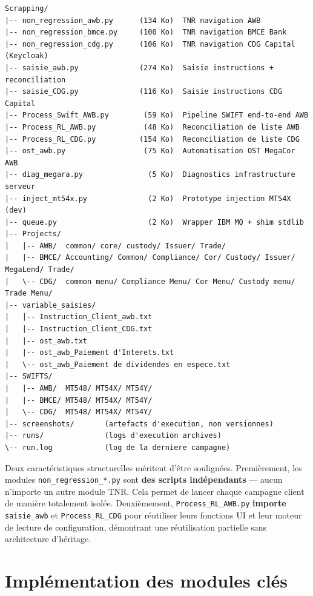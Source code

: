 \documentclass[12pt, a4paper]{report}
\begin{document}
\begin{mdframed}[backgroundcolor=codeGray, linewidth=0pt, innerleftmargin=8pt, innertopmargin=6pt]
\begin{verbatim}
Scrapping/
|-- non_regression_awb.py      (134 Ko)  TNR navigation AWB
|-- non_regression_bmce.py     (100 Ko)  TNR navigation BMCE Bank
|-- non_regression_cdg.py      (106 Ko)  TNR navigation CDG Capital (Keycloak)
|-- saisie_awb.py              (274 Ko)  Saisie instructions + reconciliation
|-- saisie_CDG.py              (116 Ko)  Saisie instructions CDG Capital
|-- Process_Swift_AWB.py        (59 Ko)  Pipeline SWIFT end-to-end AWB
|-- Process_RL_AWB.py           (48 Ko)  Reconciliation de liste AWB
|-- Process_RL_CDG.py          (154 Ko)  Reconciliation de liste CDG
|-- ost_awb.py                  (75 Ko)  Automatisation OST MegaCor AWB
|-- diag_megara.py               (5 Ko)  Diagnostics infrastructure serveur
|-- inject_mt54x.py              (2 Ko)  Prototype injection MT54X (dev)
|-- queue.py                     (2 Ko)  Wrapper IBM MQ + shim stdlib
|-- Projects/
|   |-- AWB/  common/ core/ custody/ Issuer/ Trade/
|   |-- BMCE/ Accounting/ Common/ Compliance/ Cor/ Custody/ Issuer/ MegaLend/ Trade/
|   \-- CDG/  common menu/ Compliance Menu/ Cor Menu/ Custody menu/ Trade Menu/
|-- variable_saisies/
|   |-- Instruction_Client_awb.txt
|   |-- Instruction_Client_CDG.txt
|   |-- ost_awb.txt
|   |-- ost_awb_Paiement d'Interets.txt
|   \-- ost_awb_Paiement de dividendes en espece.txt
|-- SWIFTS/
|   |-- AWB/  MT548/ MT54X/ MT54Y/
|   |-- BMCE/ MT548/ MT54X/ MT54Y/
|   \-- CDG/  MT548/ MT54X/ MT54Y/
|-- screenshots/       (artefacts d'execution, non versionnes)
|-- runs/              (logs d'execution archives)
\-- run.log            (log de la derniere campagne)
\end{verbatim}
\end{mdframed}

Deux caractéristiques structurelles méritent d'être soulignées. Premièrement, les modules \texttt{non\_regression\_*.py} sont \textbf{des scripts indépendants} — aucun n'importe un autre module TNR. Cela permet de lancer chaque campagne client de manière totalement isolée. Deuxièmement, \texttt{Process\_RL\_AWB.py} \textbf{importe} \texttt{saisie\_awb} et \texttt{Process\_RL\_CDG} pour réutiliser leurs fonctions UI et leur moteur de lecture de configuration, démontrant une réutilisation partielle sans architecture d'héritage.

\section{Implémentation des modules clés}
\end{document}
